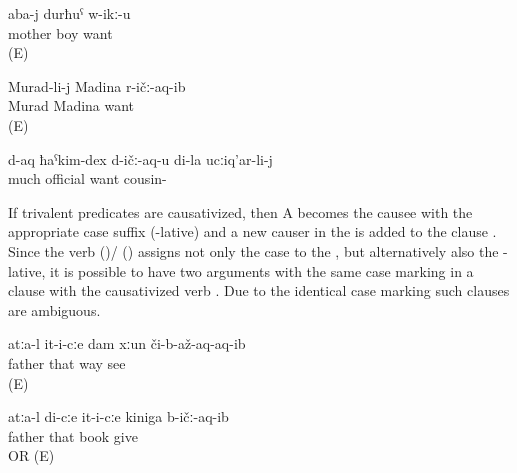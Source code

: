 \begin{exe}
	\ex	\label{ex:Mother, son; Murad, Madina@60}
	\begin{xlist}
		\ex	\label{ex:Mother likes/wants her son@60a}
		\gll	aba-j	durħuˁ	w-ikː-u\\
			mother	boy	want\\
		\glt	{} (E)

		\ex	\label{ex:Murad loved Madina@60b}
		\gll	Murad-li-j	Madina	r-ičː-aq-ib\\
			Murad	Madina	want\\
		\glt	{} (E)
	\end{xlist}

	\ex	\label{ex:My cousin loves official appointments very much}
	\gll	d-aq	ħaˁkim-dex	d-ičː-aq-u	di-la	ucːiq'ar-li-j\\
		much	official	want		cousin-\\
	\glt	{}
\end{exe}

If trivalent predicates are causativized, then A becomes the causee with the appropriate case suffix (-lative) and a new causer in the  is added to the clause . Since the verb  ()\slash{} ()  assigns not only the  case to the , but alternatively also the -lative, it is possible to have two arguments with the same case marking in a clause with the causativized verb  . Due to the identical case marking such clauses are ambiguous.

\begin{exe}
	\ex	\label{ex:Father made him show me the way@61}
	\gll	atːa-l	it-i-cːe	dam	xːun	či-b-až-aq-aq-ib\\
		father	that		way	see\\
	\glt	{} (E)

	\ex	\label{ex:Father made him give me the book}
	\gll	atːa-l	di-cːe	it-i-cːe	kiniga	b-ičː-aq-ib\\
		father		that	book	give\\
	\glt	{} OR  (E)
\end{exe}

